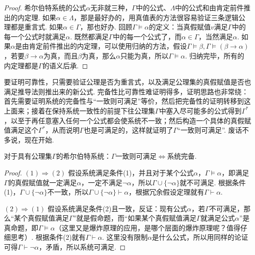 \documentclass[main.tex]{subfiles}
\begin{document}
\begin{proof}
    希尔伯特系统的公式\(\alpha\)无非就三种，\(\Gamma\)中的公式、\(\Lambda\)中的公式和由肯定前件推出的内定理. \newline
    如果\(\alpha \in \Lambda\)，那是最好办的，用真值表的方法很容易验证三条逻辑公理都是重言式. \newline
    如果\(\alpha \in \Gamma\)，那也好办. 回顾\(\Gamma \vDash \alpha\)的定义：当真假赋值\(v\)满足\(\Gamma\)中的每一个公式时就满足\(\alpha\). 既然都满足\(\Gamma\)中的每一个公式了，而\(\alpha \in \Gamma\)，当然满足\(\alpha\). \newline
    如果\(\alpha\)是由肯定前件推出的内定理，可以使用归纳的方法，假设\(\Gamma \vDash \beta, \Gamma \vDash (\beta \to \alpha)\)，若要\(\beta \to \alpha\)为真，而且\(\beta\)为真，那么\(\alpha\)只能为真，所以\(\Gamma \vDash \alpha\). 归纳完毕，所有的内定理都是\(\Gamma\)的语义后承.
\end{proof}


\vspace{1cm}

要证明可靠性，只需要验证公理是否为重言式，以及满足公理集的真假赋值是否也满足推导法则推出来的新公式. 完备性比可靠性难证明得多，证明思路也非常绕：首先需要证明系统的完备性与“一致则可满足”等价，然后把完备性的证明转移到这上面来；接着在保持系统一致性的前提下往公理集\(\Gamma\)中塞入尽可能多的公式得到\(\Gamma^*\)，以至于再任意塞入任何一个公式都会使系统不一致；然后构造一个具体的真假赋值满足这个\(\Gamma^*\)，从而说明\(\Gamma\)也是可满足的，这样就证明了\(\Gamma\)“一致则可满足”. 废话不多说，现在开始.

\begin{lemma}{}
    对于具有公理集\(\Gamma\)的希尔伯特系统：\(\Gamma\)一致则可满足\(\Longleftrightarrow\)系统完备.
\end{lemma}

\begin{proof}
    \((1)\Rightarrow(2)\)  假设系统满足条件(1)，并且对于某个公式\(\alpha\)，\(\Gamma \vDash \alpha\)，即满足\(\Gamma\)的真假赋值就一定满足\(\alpha\)，一定不满足\(\neg\alpha\)，所以\(\Gamma \cup \{\neg\alpha\}\)就不可满足. 根据条件(1)，\(\Gamma \cup \{\neg\alpha\}\)不一致，所以\(\Gamma \cup \{\neg \alpha\} \vdash \alpha\)，根据冗余假设定理就有\(\Gamma \vdash \alpha\).

    \((2)\Rightarrow(1)\)  假设系统满足条件(2)且一致，反证：现有公式\(\alpha\)，若\(\Gamma\)不可满足，那么“某个真假赋值满足\(\Gamma\)”就是假命题，而“如果某个真假赋值满足\(\Gamma\)就满足公式\(\alpha\)”是真命题，即\(\Gamma \vDash \alpha\)（这里又是爆炸原理的应用，是哪个层面的爆炸原理呢？值得仔细思考）. 根据条件(2)就有\(\Gamma \vdash \alpha\). 这里没有限制\(\alpha\)是什么公式，所以用同样的论证可得\(\Gamma \vdash \neg \alpha\)，矛盾，所以系统可满足.
\end{proof}
\end{document}

